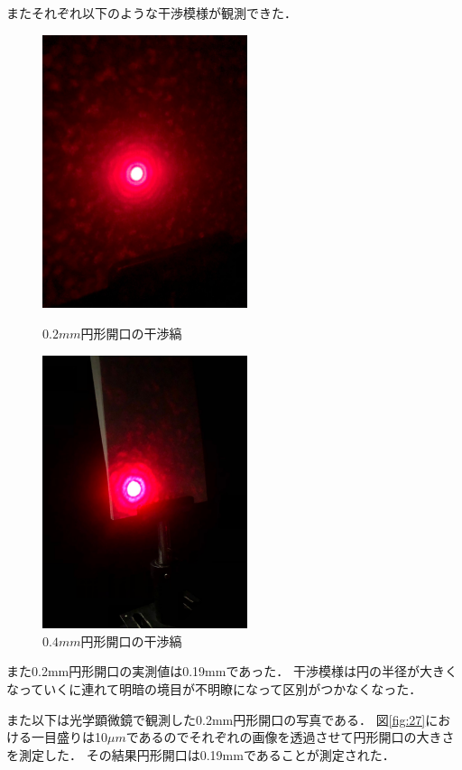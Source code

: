 \documentclass[11pt, a4paper]{jsarticle}
\begin{document}
またそれぞれ以下のような干渉模様が観測できた．
\begin{figure}[htbp]
 \begin{minipage}{0.45\hsize}
  \begin{center}
   \includegraphics[width=60mm]{fig6.png}
  \end{center}
  \caption{$0.2mm$円形開口の干渉縞}
  \label{fig:six}
 \end{minipage}
 \begin{minipage}{0.45\hsize}
  \begin{center}
   \includegraphics[width=60mm]{fig7.png}
  \end{center}
  \caption{$0.4mm$円形開口の干渉縞}
  \label{fig:seven}
 \end{minipage}
\end{figure}

また0.2mm円形開口の実測値は0.19mmであった．
干渉模様は円の半径が大きくなっていくに連れて明暗の境目が不明瞭になって区別がつかなくなった．

\newpage
また以下は光学顕微鏡で観測した0.2mm円形開口の写真である．
図\ref{fig:27}における一目盛りは10${\mu}m$であるのでそれぞれの画像を透過させて円形開口の大きさを測定した．
その結果円形開口は0.19mmであることが測定された．
\end{document}
